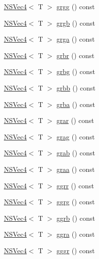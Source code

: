 \begin{DoxyCompactItemize}
\item 
\hyperlink{structNSVec4}{N\-S\-Vec4}$<$ T $>$ \hyperlink{structNSVec4_a9ca2ba34e7b4cf254de687d1187fcb24}{grgg} () const 
\item 
\hyperlink{structNSVec4}{N\-S\-Vec4}$<$ T $>$ \hyperlink{structNSVec4_ad479364ba9ac4262acbf66da18423141}{grgb} () const 
\item 
\hyperlink{structNSVec4}{N\-S\-Vec4}$<$ T $>$ \hyperlink{structNSVec4_aa94549413dbb4d9a83dc306e107300b5}{grga} () const 
\item 
\hyperlink{structNSVec4}{N\-S\-Vec4}$<$ T $>$ \hyperlink{structNSVec4_add19bea916d85cf2b72644f284135592}{grbr} () const 
\item 
\hyperlink{structNSVec4}{N\-S\-Vec4}$<$ T $>$ \hyperlink{structNSVec4_a7ab35ccced990e09a9d6e8ff9e40115c}{grbg} () const 
\item 
\hyperlink{structNSVec4}{N\-S\-Vec4}$<$ T $>$ \hyperlink{structNSVec4_a05551633f4256d60d53d5ccb7231b995}{grbb} () const 
\item 
\hyperlink{structNSVec4}{N\-S\-Vec4}$<$ T $>$ \hyperlink{structNSVec4_adc8eb4fe40a5ecd40248542913166669}{grba} () const 
\item 
\hyperlink{structNSVec4}{N\-S\-Vec4}$<$ T $>$ \hyperlink{structNSVec4_ace63b03b845600dfc600bc3a039089f8}{grar} () const 
\item 
\hyperlink{structNSVec4}{N\-S\-Vec4}$<$ T $>$ \hyperlink{structNSVec4_ab8f108da0b901977390f08a8d338da2d}{grag} () const 
\item 
\hyperlink{structNSVec4}{N\-S\-Vec4}$<$ T $>$ \hyperlink{structNSVec4_aed0aabe14bffccb48b8c2930184f8010}{grab} () const 
\item 
\hyperlink{structNSVec4}{N\-S\-Vec4}$<$ T $>$ \hyperlink{structNSVec4_ad6f9a3b31b553440d7dd401dde94f8fe}{graa} () const 
\item 
\hyperlink{structNSVec4}{N\-S\-Vec4}$<$ T $>$ \hyperlink{structNSVec4_aed75817732017d6d94ccdae5f4622f93}{ggrr} () const 
\item 
\hyperlink{structNSVec4}{N\-S\-Vec4}$<$ T $>$ \hyperlink{structNSVec4_a2a826b494ce9a2f4347d8002164fdb6f}{ggrg} () const 
\item 
\hyperlink{structNSVec4}{N\-S\-Vec4}$<$ T $>$ \hyperlink{structNSVec4_a47f2d40f181352b5dce3dbc8ad4436f0}{ggrb} () const 
\item 
\hyperlink{structNSVec4}{N\-S\-Vec4}$<$ T $>$ \hyperlink{structNSVec4_a6d53019d0d3af29459e4ffa6728dc1f3}{ggra} () const 
\item 
\hyperlink{structNSVec4}{N\-S\-Vec4}$<$ T $>$ \hyperlink{structNSVec4_a322b839571b29aaa57ab794720e17d8d}{gggr} () const 

\end{DoxyCompactItemize}
